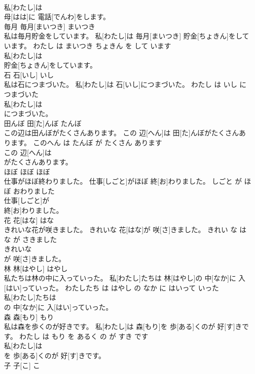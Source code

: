 \documentclass[8pt]{extreport}
\begin{document}
\begin{CJK}{UTF8}{min}
\\	私[わたし]は
\\	母[はは]に 電話[でんわ]をします。		
\\	毎月	毎月[まいつき]	まいつき	
\\	私は毎月貯金をしています。	私[わたし]は 毎月[まいつき] 貯金[ちょきん]をしています。	わたし は まいつき ちょきん を して います	
\\	私[わたし]は
\\	貯金[ちょきん]をしています。		
\\	石	石[いし]	いし	
\\	私は石につまづいた。	私[わたし]は 石[いし]につまづいた。	わたし は いし に つまづいた	
\\	私[わたし]は
\\	につまづいた。		
\\	田んぼ	田[た]んぼ	たんぼ	
\\	この辺は田んぼがたくさんあります。	この 辺[へん]は 田[た]んぼがたくさんあります。	このへん は たんぼ が たくさん あります	
\\	この 辺[へん]は
\\	がたくさんあります。		
\\	ほぼ	ほぼ	ほぼ	
\\	仕事がほぼ終わりました。	仕事[しごと]がほぼ 終[お]わりました。	しごと が ほぼ おわりました	
\\	仕事[しごと]が
\\	終[お]わりました。		
\\	花	花[はな]	はな	
\\	きれいな花が咲きました。	きれいな 花[はな]が 咲[さ]きました。	きれい な はな が さきました	
\\	きれいな
\\	が 咲[さ]きました。		
\\	林	林[はやし]	はやし	
\\	私たちは林の中に入っていった。	私[わたし]たちは 林[はやし]の 中[なか]に 入[はい]っていった。	わたしたち は はやし の なか に はいって いった	
\\	私[わたし]たちは
\\	の 中[なか]に 入[はい]っていった。		
\\	森	森[もり]	もり	
\\	私は森を歩くのが好きです。	私[わたし]は 森[もり]を 歩[ある]くのが 好[す]きです。	わたし は もり を あるく の が すき です	
\\	私[わたし]は
\\	を 歩[ある]くのが 好[す]きです。		
\\	子	子[こ]	こ	

\end{CJK}
\end{document}
